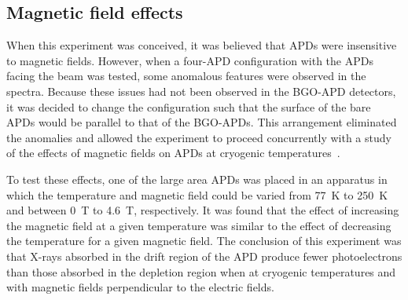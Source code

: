 \documentclass[oneside,12pt]{memoir}
\begin{document}
\subsection{Magnetic field effects}
\label{sec:bapd_field}
When this experiment was conceived, it was believed that APDs were insensitive to magnetic fields. However, when a four-APD configuration with the APDs facing the beam was tested, some anomalous features were observed in the spectra. Because these issues had not been observed in the BGO-APD detectors, it was decided to change the configuration such that the surface of the bare APDs would be parallel to that of the BGO-APDs. This arrangement eliminated the anomalies and allowed the experiment to proceed concurrently with a study of the effects of magnetic fields on APDs at cryogenic temperatures~\cite{gentile11}.\par
To test these effects, one of the large area APDs was placed in an apparatus in which the temperature and magnetic field could be varied from 77~K to 250~K and between 0~T to 4.6~T, respectively. It was found that the effect of increasing the magnetic field at a given temperature was similar to the effect of decreasing the temperature for a given magnetic field. The conclusion of this experiment was that X-rays absorbed in the drift region of the APD produce fewer photoelectrons than those absorbed in the depletion region when at cryogenic temperatures and with magnetic fields perpendicular to the electric fields.\par
\end{document}
